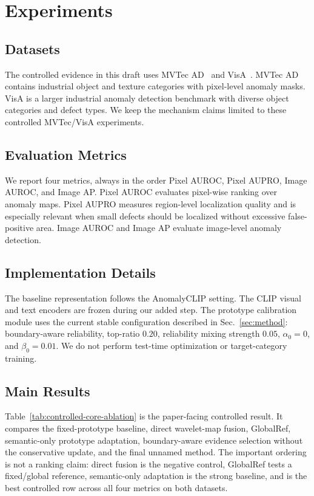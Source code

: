 \section{Experiments}
\label{sec:experiments}

\subsection{Datasets}
The controlled evidence in this draft uses MVTec AD~\cite{bergmann2019mvtec}
and VisA~\cite{zou2022visa}. MVTec AD contains industrial object and texture
categories with pixel-level anomaly masks. VisA is a larger industrial anomaly
detection benchmark with diverse object categories and defect types. We keep
the mechanism claims limited to these controlled MVTec/VisA experiments.

\subsection{Evaluation Metrics}
We report four metrics, always in the order Pixel AUROC, Pixel AUPRO, Image
AUROC, and Image AP.
Pixel AUROC evaluates pixel-wise ranking over anomaly maps. Pixel AUPRO
measures region-level localization quality and is especially relevant when
small defects should be localized without excessive false-positive area.
Image AUROC and Image AP evaluate image-level anomaly detection.

\subsection{Implementation Details}
The baseline representation follows the AnomalyCLIP setting. The CLIP visual
and text encoders are frozen during our added step. The prototype calibration
module uses the current stable configuration described in
Sec.~\ref{sec:method}: boundary-aware reliability, top-ratio $0.20$, reliability
mixing strength $0.05$, $\alpha_0=0$, and $\beta_0=0.01$. We do not perform
test-time optimization or target-category training.

\subsection{Main Results}
Table~\ref{tab:controlled-core-ablation} is the paper-facing controlled result.
It compares the fixed-prototype baseline, direct wavelet-map fusion,
GlobalRef, semantic-only prototype adaptation, boundary-aware evidence
selection without the conservative update, and the final unnamed method. The
important ordering is not a ranking claim: direct fusion is the negative
control, GlobalRef tests a fixed/global reference, semantic-only
adaptation is the strong baseline, and \method{} is the best controlled row
across all four metrics on both datasets.

